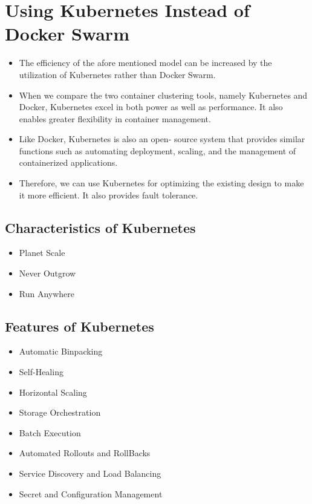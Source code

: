 \chapter{Using Kubernetes Instead of Docker Swarm}

\begin{itemize}
    \item The efficiency of the afore mentioned model can be increased by the utilization of Kubernetes rather than Docker Swarm.
    \item When we compare the two container clustering tools, namely Kubernetes and Docker, Kubernetes excel in both power as well as performance. It also enables greater flexibility in container management.
    \item Like Docker, Kubernetes is also an open- source system that provides similar functions such as automating deployment, scaling, and the management of containerized applications.
    \item Therefore, we can use Kubernetes for optimizing the existing design to make it more efficient. It also provides fault tolerance.
\end{itemize}

\section{Characteristics of Kubernetes}
\begin{itemize}
    \item Planet Scale
    \item Never Outgrow
    \item Run Anywhere
\end{itemize}

\section{Features of Kubernetes}
\begin{itemize}
    \item Automatic Binpacking
    \item Self-Healing
    \item Horizontal Scaling
    \item Storage Orchestration
    \item Batch Execution
    \item Automated Rollouts and RollBacks
    \item Service Discovery and Load Balancing
    \item Secret and Configuration Management
\end{itemize}

